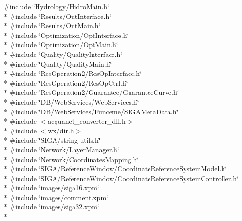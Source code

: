 {\ttfamily \#include \char`\"{}Hydrology/\+Hidro\+Main.\+h\char`\"{}}\\*
{\ttfamily \#include \char`\"{}Results/\+Out\+Interface.\+h\char`\"{}}\\*
{\ttfamily \#include \char`\"{}Results/\+Out\+Main.\+h\char`\"{}}\\*
{\ttfamily \#include \char`\"{}Optimization/\+Opt\+Interface.\+h\char`\"{}}\\*
{\ttfamily \#include \char`\"{}Optimization/\+Opt\+Main.\+h\char`\"{}}\\*
{\ttfamily \#include \char`\"{}Quality/\+Quality\+Interface.\+h\char`\"{}}\\*
{\ttfamily \#include \char`\"{}Quality/\+Quality\+Main.\+h\char`\"{}}\\*
{\ttfamily \#include \char`\"{}Res\+Operation2/\+Res\+Op\+Interface.\+h\char`\"{}}\\*
{\ttfamily \#include \char`\"{}Res\+Operation2/\+Res\+Op\+Ctrl.\+h\char`\"{}}\\*
{\ttfamily \#include \char`\"{}Res\+Operation2/\+Guarantee/\+Guarantee\+Curve.\+h\char`\"{}}\\*
{\ttfamily \#include \char`\"{}D\+B/\+Web\+Services/\+Web\+Services.\+h\char`\"{}}\\*
{\ttfamily \#include \char`\"{}D\+B/\+Web\+Services/\+Funceme/\+S\+I\+G\+A\+Meta\+Data.\+h\char`\"{}}\\*
{\ttfamily \#include $<$acquanet\+\_\+converter\+\_\+dll.\+h$>$}\\*
{\ttfamily \#include $<$wx/dir.\+h$>$}\\*
{\ttfamily \#include \char`\"{}S\+I\+G\+A/string-\/utils.\+h\char`\"{}}\\*
{\ttfamily \#include \char`\"{}Network/\+Layer\+Manager.\+h\char`\"{}}\\*
{\ttfamily \#include \char`\"{}Network/\+Coordinates\+Mapping.\+h\char`\"{}}\\*
{\ttfamily \#include \char`\"{}S\+I\+G\+A/\+Reference\+Window/\+Coordinate\+Reference\+System\+Model.\+h\char`\"{}}\\*
{\ttfamily \#include \char`\"{}S\+I\+G\+A/\+Reference\+Window/\+Coordinate\+Reference\+System\+Controller.\+h\char`\"{}}\\*
{\ttfamily \#include \char`\"{}images/siga16.\+xpm\char`\"{}}\\*
{\ttfamily \#include \char`\"{}images/comment.\+xpm\char`\"{}}\\*
{\ttfamily \#include \char`\"{}images/siga32.\+xpm\char`\"{}}\\*
